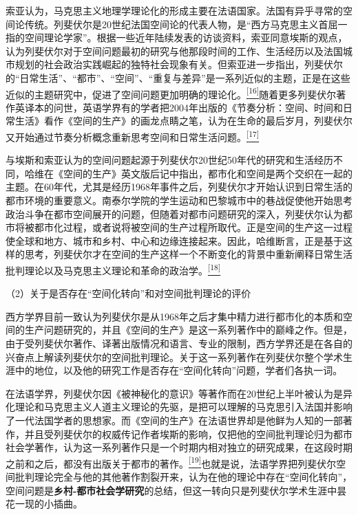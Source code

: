 \documentclass[UTF8, fontset = sourcesans, a4paper, oneside, zihao =
-4, scheme=chinese, no-math, space=true]{ctexbook}
\begin{document}
索亚认为，马克思主义地理学理论化的形成主要在法语国家。法国有异乎寻常的空间论传统。列斐伏尔是20世纪法国空间论的代表人物，是``西方马克思主义首屈一指的空间理论学家''。根据一些近年陆续发表的访谈资料，索亚同意埃斯的观点，认为列斐伏尔对于空间问题最初的研究与他那段时间的工作、生活经历以及法国城市规划的社会政治实践崛起的独特社会现象有关。但索亚进一步指出，列斐伏尔的``日常生活''、``都市''、``空间''、``重复与差异''是一系列近似的主题，正是在这些近似的主题研究中，促进了空间问题更加明确的理论化。\protect\hypertarget{part0004.htmlux5cux23w16}{}{}\protect\hyperlink{part0004.htmlux5cux23m16}{\textsuperscript{{[}16{]}}}随着更多列斐伏尔著作英译本的问世，英语学界有的学者把2004年出版的《节奏分析：空间、时间和日常生活》看作《空间的生产》的画龙点睛之笔，认为在生命的最后岁月，列斐伏尔又开始通过节奏分析概念重新思考空间和日常生活问题。\protect\hypertarget{part0004.htmlux5cux23w17}{}{}\protect\hyperlink{part0004.htmlux5cux23m17}{\textsuperscript{{[}17{]}}}

与埃斯和索亚认为的空间问题起源于列斐伏尔20世纪50年代的研究和生活经历不同，哈维在《空间的生产》英文版后记中指出，都市化和空间是两个交织在一起的主题。在60年代，尤其是经历1968年事件之后，列斐伏尔才开始认识到日常生活的都市环境的重要意义。南泰尔学院的学生运动和巴黎城市中的巷战促使他开始思考政治斗争在都市空间展开的问题，但随着对都市问题研究的深入，列斐伏尔认为都市将被都市化过程，或者说将被空间的生产过程所取代。正是空间的生产这一过程使全球和地方、城市和乡村、中心和边缘连接起来。因此，哈维断言，正是基于这样的思考，列斐伏尔才在空间的生产这样一个不断变化的背景中重新阐释日常生活批判理论以及马克思主义理论和革命的政治学。\protect\hypertarget{part0004.htmlux5cux23w18}{}{}\protect\hyperlink{part0004.htmlux5cux23m18}{\textsuperscript{{[}18{]}}}

（2）关于是否存在``空间化转向''和对空间批判理论的评价

西方学界目前一致认为列斐伏尔是从1968年之后才集中精力进行都市化的本质和空间的生产问题研究的，并且《空间的生产》是这一系列著作中的巅峰之作。但是，由于受列斐伏尔著作、译著出版情况和语言、专业的限制，西方学界还是在各自的兴奋点上解读列斐伏尔的空间批判理论。关于这一系列著作在列斐伏尔整个学术生涯中的地位，以及他的研究工作是否存在``空间化转向''问题，学者们各执一词。

在法语学界，列斐伏尔因《被神秘化的意识》等著作而在20世纪上半叶被认为是异化理论和马克思主义人道主义理论的先驱，是把可以理解的马克思引入法国并影响了一代法国学者的思想家。而《空间的生产》在法语世界却是他鲜为人知的一部著作，并且受列斐伏尔的权威传记作者埃斯的影响，仅把他的空间批判理论归为都市社会学著作，认为这一系列著作只是一个时期内相对独立的研究成果，在这段时期之前和之后，都没有出版关于都市的著作。\protect\hypertarget{part0004.htmlux5cux23w19}{}{}\protect\hyperlink{part0004.htmlux5cux23m19}{\textsuperscript{{[}19{]}}}也就是说，法语学界把列斐伏尔空间批判理论完全与他的其他著作割裂开来，认为在他的理论中存在``空间化转向''，空间问题是\textbf{乡村-都市社会学研究}的总结，但这一转向只是列斐伏尔学术生涯中昙花一现的小插曲。
\end{document}
